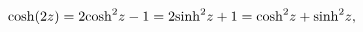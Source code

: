 \[\mathop{\cosh\/}\nolimits\!\left(2z\right)=2{\mathop{\cosh\/}\nolimits^{2}}z-1%
=2{\mathop{\sinh\/}\nolimits^{2}}z+1\\
={\mathop{\cosh\/}\nolimits^{2}}z+{\mathop{\sinh\/}\nolimits^{2}}z,\]